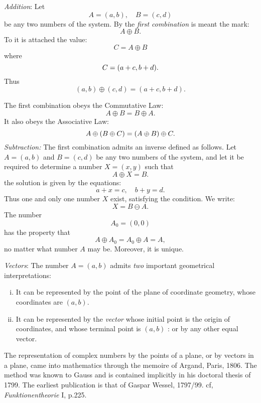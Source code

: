 \documentclass[letter,oneside]{memoir}
\begin{document}
\emph{Addition}: Let
\[
	A=(a,b), \quad B=(c,d)
\] be any two numbers of the system. By the \emph{first combination} is meant the mark:
\[
A\oplus B
.\] To it is attached the value:
\[
C=A\oplus B
\] where
\[
	C=\pbr*{a+c, b+d} 
.\] Thus
\begin{equation}\label{oplus}
	(a,b)\oplus (c,d)= (a+c, b+d).
\end{equation}

The first combination obeys the Commutative Law:
\[
A\oplus B = B\oplus A
.\] It also obeys the Associative Law:
\[
	A\oplus \pbr*{B\oplus C} =\pbr*{A\oplus B} \oplus C
.\] \emph{Subtraction:} The first combination admits an inverse defined as follows. Let $A=(a,b)$ and $B=(c,d)$ be any two numbers of the system, and let it be required to determine a number $X=(x,y)$ such that
\[
A\oplus X=B
.\] the solution is given by the equations:
\[
a+x=c, \quad b+y=d
.\] Thus one and only one number $X$ exist, satisfying the condition. We write:
\[
X=B\ominus A
.\] The number
 \[
	 A_0=(0,0)
\] has the property that
\[
A\oplus A_0=A_0\oplus A = A
,\] no matter what number $A$ may be. Moreover, it is unique.

\emph{Vectors}: The number $A=(a,b)$ admits \emph{two} important geometrical interpretations:
\begin{enumerate}[i.]
	\item It can be represented by the point of the plane of coordinate geometry, whose coordinates are $(a,b)$.
	\item It can be represented by the \emph{vector} whose initial point is the origin of coordinates, and whose terminal point is $(a,b)$ : or by any other equal vector.
\end{enumerate}
The representation of complex numbers by the points of a plane, or by vectors in a plane, came into mathematics through the memoire of Argand, Paris, 1806. The method was known to Gauss and is contained implicitly in his doctoral thesis of 1799. The earliest publication is that of Gaspar Wessel, 1797/99. cf, \emph{Funktionentheorie} I, p.225.


\begin{figure}[htbp]
	\centering
\end{figure} 
\end{document}
